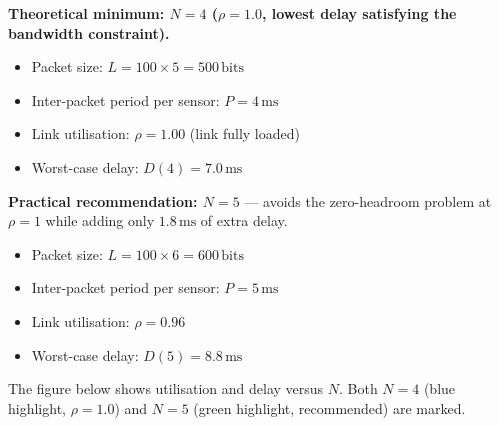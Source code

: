 \documentclass[12pt, a4paper]{article}
\begin{document}
\begin{keybox}
  \textbf{Theoretical minimum: $N = 4$ \quad ($\rho = 1.0$, lowest delay
  satisfying the bandwidth constraint).}
  \begin{itemize}[leftmargin=1.2em, itemsep=2pt]
    \item Packet size: $L = 100 \times 5 = 500\,\mathrm{bits}$
    \item Inter-packet period per sensor: $P = 4\,\mathrm{ms}$
    \item Link utilisation: $\rho = 1.00$ (link fully loaded)
    \item Worst-case delay: $D(4) = 7.0\,\mathrm{ms}$
  \end{itemize}

  \textbf{Practical recommendation: $N = 5$} --- avoids the zero-headroom
  problem at $\rho = 1$ while adding only $1.8\,\mathrm{ms}$ of extra delay.
  \begin{itemize}[leftmargin=1.2em, itemsep=2pt]
    \item Packet size: $L = 100 \times 6 = 600\,\mathrm{bits}$
    \item Inter-packet period per sensor: $P = 5\,\mathrm{ms}$
    \item Link utilisation: $\rho = 0.96$
    \item Worst-case delay: $D(5) = 8.8\,\mathrm{ms}$
  \end{itemize}
\end{keybox}

The figure below shows utilisation and delay versus $N$. Both $N=4$ (blue
highlight, $\rho = 1.0$) and $N = 5$ (green highlight, recommended) are marked.
\end{document}
